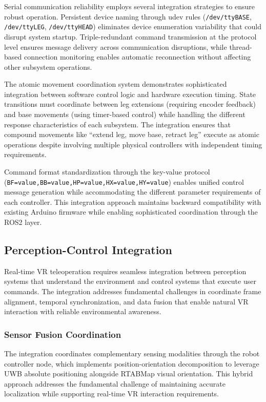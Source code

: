 Serial communication reliability employs several integration strategies to ensure robust operation. Persistent device naming through udev rules (\texttt{/dev/ttyBASE}, \texttt{/dev/ttyLEG}, \texttt{/dev/ttyHEAD}) eliminates device enumeration variability that could disrupt system startup. Triple-redundant command transmission at the protocol level ensures message delivery across communication disruptions, while thread-based connection monitoring enables automatic reconnection without affecting other subsystem operations.

The atomic movement coordination system demonstrates sophisticated integration between software control logic and hardware execution timing. State transitions must coordinate between leg extensions (requiring encoder feedback) and base movements (using timer-based control) while handling the different response characteristics of each subsystem. The integration ensures that compound movements like ``extend leg, move base, retract leg'' execute as atomic operations despite involving multiple physical controllers with independent timing requirements.

Command format standardization through the key-value protocol (\texttt{BF=value,BB=value,}\linebreak\texttt{HP=value,HX=value,HY=value}) enables unified control message generation while accommodating the different parameter requirements of each controller. This integration approach maintains backward compatibility with existing Arduino firmware while enabling sophisticated coordination through the ROS2 layer.

\subsection{Perception-Control Integration}

Real-time VR teleoperation requires seamless integration between perception systems that understand the environment and control systems that execute user commands. The integration addresses fundamental challenges in coordinate frame alignment, temporal synchronization, and data fusion that enable natural VR interaction with reliable environmental awareness.

\subsubsection{Sensor Fusion Coordination}

The integration coordinates complementary sensing modalities through the robot controller node, which implements position-orientation decomposition to leverage UWB absolute positioning alongside RTABMap visual orientation. This hybrid approach addresses the fundamental challenge of maintaining accurate localization while supporting real-time VR interaction requirements.

